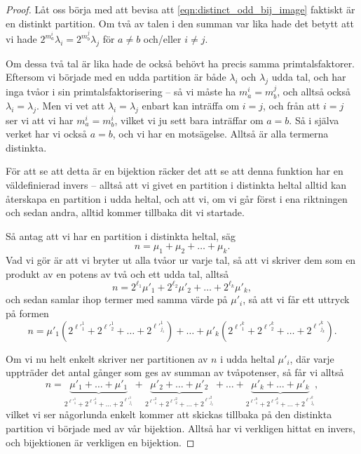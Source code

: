\documentclass[nobib]{tufte-handout}
\begin{document}
\begin{theorem}
\begin{proof}
    Låt oss börja med att bevisa att \eqref{eqn:distinct_odd_bij_image} faktiskt är en distinkt partition. Om två av talen i den summan var lika hade det betytt att vi hade $2^{m_a^i}\lambda_i = 2^{m_b^j}\lambda_j$ för $a \neq b$ och/eller $i \neq j$. 
    
    Om dessa två tal är lika hade de också behövt ha precis samma primtalsfaktorer. Eftersom vi började med en udda partition är både $\lambda_i$ och $\lambda_j$ udda tal, och har inga tvåor i sin primtalsfaktorisering -- så vi måste ha $m_a^i = m_b^j$, och alltså också $\lambda_i = \lambda_j$. Men vi vet att $\lambda_i = \lambda_j$ enbart kan inträffa om $i = j$, och från att $i = j$ ser vi att vi har $m_a^i = m_b^i$, vilket vi ju sett bara inträffar om $a = b$. Så i själva verket har vi också $a = b$, och vi har en motsägelse. Alltså är alla termerna distinkta.

    För att se att detta är en bijektion räcker det att se att denna funktion har en väldefinierad invers -- alltså att vi givet en partition i distinkta heltal alltid kan återskapa en partition i udda heltal, och att vi, om vi går först i ena riktningen och sedan andra, alltid kommer tillbaka dit vi startade.

    Så antag att vi har en partition i distinkta heltal, säg
    $$n = \mu_1 + \mu_2 + \ldots + \mu_k.$$
    Vad vi gör är att vi bryter ut alla tvåor ur varje tal, så att vi skriver dem som en produkt av en potens av två och ett udda tal, alltså
    $$n = 2^{\ell_1}\mu'_1 + 2^{\ell_2}\mu'_2 + \ldots + 2^{\ell_k}\mu'_k,$$
    och sedan samlar ihop termer med samma värde på $\mu'_i$, så att vi får ett uttryck på formen
    $$n = \mu'_1(2^{\ell'^1_1} + 2^{\ell'^1_2} + \ldots + 2^{\ell'^1_{j_1}}) + \ldots + \mu'_k(2^{\ell'^k_1} + 2^{\ell'^k_2} + \ldots + 2^{\ell'^k_{j_k}}).$$

    Om vi nu helt enkelt skriver ner partitionen av $n$ i udda heltal $\mu'_i$, där varje uppträder det antal gånger som ges av summan av tvåpotenser, så får vi alltså
    $$n = \underbrace{\mu'_1 + \ldots + \mu'_1}_{2^{\ell'^1_1} + 2^{\ell'^1_2} + \ldots + 2^{\ell'^1_{j_1}}} + \underbrace{\mu'_2 + \ldots + \mu'_2}_{2^{\ell'^2_1} + 2^{\ell'^2_2} + \ldots + 2^{\ell'^2_{j_2}}} + \ldots + \underbrace{\mu'_k + \ldots + \mu'_k}_{2^{\ell'^k_1} + 2^{\ell'^k_2} + \ldots + 2^{\ell'^k_{j_k}}},$$
    vilket vi ser någorlunda enkelt kommer att skickas tillbaka på den distinkta partition vi började med av vår bijektion. Alltså har vi verkligen hittat en invers, och bijektionen är verkligen en bijektion.
  \end{proof}
\end{theorem}
\end{document}
